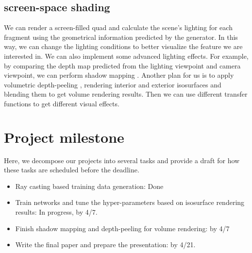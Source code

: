 \documentclass[journal]{vgtc}                %
\begin{document}
\subsection{screen-space shading}
We can render a screen-filled quad and calculate the scene's lighting for each fragment using the geometrical information predicted by the generator. In this way, we can change the lighting conditions to better visualize the feature we are interested in. We can also implement some advanced lighting effects. For example, by comparing the depth map predicted from the lighting viewpoint and camera viewpoint, we can perform shadow mapping \cite{williams1978casting}. Another plan for us is to apply volumetric depth-peeling \cite{zolt2003depthpeel},  rendering interior and exterior isosurfaces and blending them to get volume rendering results. Then we can use different transfer functions to get different visual effects.  


\section{Project milestone}

Here, we decompose our projects into several tasks and provide a draft for how these tasks are scheduled before the deadline.

\begin{itemize}
\item Ray casting based training data generation: Done
\item Train networks and tune the hyper-parameters based on isosurface rendering results: In progress, by 4/7.
\item Finish shadow mapping and depth-peeling for volume rendering: by 4/7
\item Write the final paper and prepare the presentation: by 4/21. 

\end{itemize}

%

%
%
%


\end{document}

